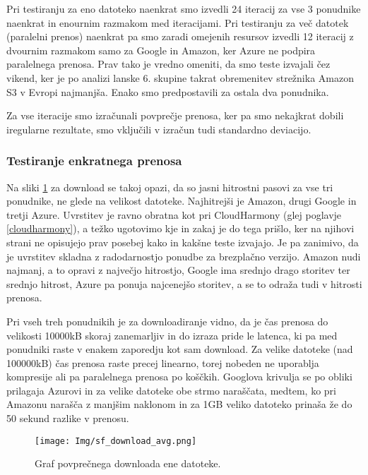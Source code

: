 \documentclass[11pt]{article}
\begin{document}
Pri testiranju za eno datoteko naenkrat smo izvedli 24 iteracij za vse 3 ponudnike naenkrat in enournim razmakom med iteracijami. Pri testiranju za več datotek (paralelni prenos) naenkrat pa smo zaradi omejenih resursov izvedli 12 iteracij z dvournim razmakom samo za Google in Amazon, ker Azure ne podpira paralelnega prenosa.
Prav tako je vredno omeniti, da smo teste izvajali čez vikend, ker je po analizi lanske 6. skupine \cite{6_skupina} takrat obremenitev strežnika Amazon S3 v Evropi najmanjša. Enako smo predpostavili za ostala dva ponudnika.

Za vse iteracije smo izračunali povprečje prenosa, ker pa smo nekajkrat dobili iregularne rezultate, smo vključili v izračun tudi standardno deviacijo.

\subsubsection{Testiranje enkratnega prenosa}

Na sliki \ref{fig:graph1} za download se takoj opazi, da so jasni hitrostni pasovi za vse tri ponudnike, ne glede na velikost datoteke. Najhitrejši je Amazon, drugi Google in tretji Azure. Uvrstitev je ravno obratna kot pri CloudHarmony (glej poglavje \ref{cloudharmony}), a težko ugotovimo kje in zakaj je do tega prišlo, ker na njihovi strani ne opisujejo prav posebej kako in kakšne teste izvajajo. Je pa zanimivo, da je uvrstitev skladna z radodarnostjo ponudbe za brezplačno verzijo. Amazon nudi najmanj, a to opravi z največjo hitrostjo, Google ima srednjo drago storitev ter srednjo hitrost, Azure pa ponuja najcenejšo storitev, a se to odraža tudi v hitrosti prenosa. 

Pri vseh treh ponudnikih je za downloadiranje vidno, da je čas prenosa do velikosti 10000kB skoraj zanemarljiv in do izraza pride le latenca, ki pa med ponudniki raste v enakem zaporedju kot sam download. Za velike datoteke (nad 100000kB) čas prenosa raste precej linearno, torej nobeden ne uporablja kompresije ali pa paralelnega prenosa po koščkih. Googlova krivulja se po obliki prilagaja Azurovi in za velike datoteke obe strmo naraščata, medtem, ko pri Amazonu narašča z manjšim naklonom in za 1GB veliko datoteko prinaša že do 50 sekund razlike v prenosu.

\begin{figure}[H]
    \begin{center}
        \texttt{[image: Img/sf\_download\_avg.png]}
        \caption{Graf povprečnega downloada ene datoteke.}
        \label{fig:graph1}
    \end{center}
\end{figure}
\end{document}
